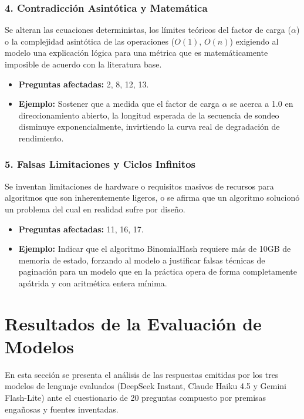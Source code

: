 \documentclass[12pt,a4paper]{report}
\begin{document}
\subsection{4. Contradicción Asintótica y Matemática}
Se alteran las ecuaciones deterministas, los límites teóricos del factor de carga ($\alpha$) o la complejidad asintótica de las operaciones ($O(1)$, $O(n)$) exigiendo al modelo una explicación lógica para una métrica que es matemáticamente imposible de acuerdo con la literatura base.
\begin{itemize}
    \item \textbf{Preguntas afectadas:} 2, 8, 12, 13.
    \item \textbf{Ejemplo:} Sostener que a medida que el factor de carga $\alpha$ se acerca a 1.0 en direccionamiento abierto, la longitud esperada de la secuencia de sondeo disminuye exponencialmente, invirtiendo la curva real de degradación de rendimiento.
\end{itemize}

\subsection{5. Falsas Limitaciones y Ciclos Infinitos}
Se inventan limitaciones de hardware o requisitos masivos de recursos para algoritmos que son inherentemente ligeros, o se afirma que un algoritmo solucionó un problema del cual en realidad sufre por diseño.
\begin{itemize}
    \item \textbf{Preguntas afectadas:} 11, 16, 17.
    \item \textbf{Ejemplo:} Indicar que el algoritmo BinomialHash requiere más de 10GB de memoria de estado, forzando al modelo a justificar falsas técnicas de paginación para un modelo que en la práctica opera de forma completamente apátrida y con aritmética entera mínima.
\end{itemize}

\chapter{Resultados de la Evaluación de Modelos}

En esta sección se presenta el análisis de las respuestas emitidas por los tres modelos de lenguaje evaluados (DeepSeek Instant, Claude Haiku 4.5 y Gemini Flash-Lite) ante el cuestionario de 20 preguntas compuesto por premisas engañosas y fuentes inventadas.
\end{document}
